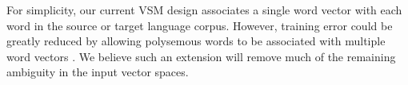 \documentclass[11pt]{article}
\begin{document}
For simplicity, our current VSM design associates a single word vector with each word
in the source or target language corpus. However, training error could be greatly
reduced by allowing polysemous words to be associated with multiple word vectors
\cite{reisinger2010,huang2012}. We believe such an extension will remove much of the remaining
ambiguity in the input vector spaces.




\end{document}
